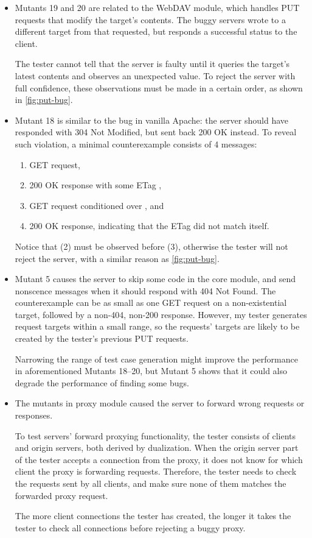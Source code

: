 \begin{itemize}
  \item Mutants 19 and 20 are related to the WebDAV module, which handles PUT
    requests that modify the target's contents.  The buggy servers wrote to a
    different target from that requested, but responds a successful status to
    the client.

    The tester cannot tell that the server is faulty until it queries the
    target's latest contents and observes an unexpected value.  To reject the
    server with full confidence, these observations must be made in a certain
    order, as shown in \autoref{fig:put-bug}.

  \item Mutant 18 is similar to the bug in vanilla Apache: the server should
    have responded with 304 Not Modified, but sent back 200 OK instead.  To
    reveal such violation, a minimal counterexample consists of 4 messages:
    \begin{enumerate}
    \item GET request,
    \item 200 OK response with some ETag ,
    \item GET request conditioned over , and
    \item 200 OK response, indicating that the ETag  did not match
      itself.
    \end{enumerate}
    Notice that (2) must be observed before (3), otherwise the tester will not
    reject the server, with a similar reason as \autoref{fig:put-bug}.

  \item Mutant 5 causes the server to skip some code in the core module, and
    send nonscence messages when it should respond with 404 Not Found.  The
    counterexample can be as small as one GET request on a non-existential
    target, followed by a non-404, non-200 response.  However, my tester
    generates request targets within a small range, so the requests' targets are
    likely to be created by the tester's previous PUT requests.

    Narrowing the range of test case generation might improve the performance in
    aforementioned Mutants 18--20, but Mutant 5 shows that it could also degrade
    the performance of finding some bugs.

  \item The mutants in proxy module caused the server to forward wrong requests
    or responses.

    To test servers' forward proxying functionality, the tester consists of
    clients and origin servers, both derived by dualization.  When the origin
    server part of the tester accepts a connection from the proxy, it does not
    know for which client the proxy is forwarding requests.  Therefore, the
    tester needs to check the requests sent by all clients, and make sure none
    of them matches the forwarded proxy request.

    The more client connections the tester has created, the longer it takes the
    tester to check all connections before rejecting a buggy proxy.
\end{itemize}

